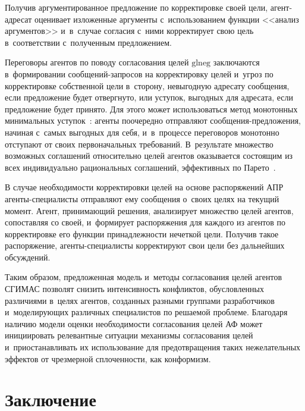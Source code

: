 \begin{multicols}{2}
  
  Получив аргументированное предложение по корректировке своей цели, 
агент-адресат оценивает изложенные аргументы с~использованием функции 
<<анализ аргументов>> и~в~случае согласия с~ними корректирует свою цель 
в~соответствии с~полученным предложением.
  
  Переговоры агентов по поводу согласования целей $\mathrm{glneg}$ 
заключаются в~формировании со\-об\-ще\-ний-за\-про\-сов на корректировку целей 
и~угроз по корректировке собственной цели в~сторону, невыгодную адресату 
сообщения, если предложение будет отвергнуто, или уступок, выгодных для 
адресата, если предложение будет принято. Для этого может использоваться 
метод монотонных минимальных уступок~\cite{15-kir}: агенты поочередно 
от\-прав\-ля\-ют со\-об\-ще\-ния-пред\-ло\-же\-ния, начиная с~самых выгодных для 
себя, и~в~процессе переговоров монотонно отступают от своих 
первоначальных требований. В~результате множество возможных соглашений 
относительно целей агентов оказывается со\-сто\-ящим из всех индивидуально 
рациональных соглашений, эффективных по Парето~\cite{4-kir}.
  
  В случае необходимости корректировки целей на основе распоряжений АПР  
аген\-ты-спе\-циа\-ли\-сты отправляют ему сообщения о~своих целях на 
текущий момент. Агент, принимающий решения, анализирует множество целей агентов, сопоставляя со 
своей, и~формирует распоряжения для каждого из агентов по корректировке 
его функции принадлежности нечеткой цели. Получив такое распоряжение,  
аген\-ты-спе\-циа\-лис\-ты корректируют свои цели без дальнейших 
обсуждений. 
  
  Таким образом, предложенная модель и~методы согласования целей агентов 
\mbox{СГИМАС} позволят снизить интенсивность конфликтов, обуслов\-лен\-ных 
различиями в~целях агентов, созданных разными группами разработчиков 
и~моделирующих различных специалистов по решаемой проб\-ле\-ме. Благодаря 
наличию модели оценки необходимости согласования целей АФ может 
инициировать релевантные ситуации механизмы согласования целей 
и~приостанавливать их использование для предотвращения таких 
нежелательных эффектов от чрезмерной спло\-чен\-ности, как конформизм. 
  
\section{Заключение}


\end{multicols}
